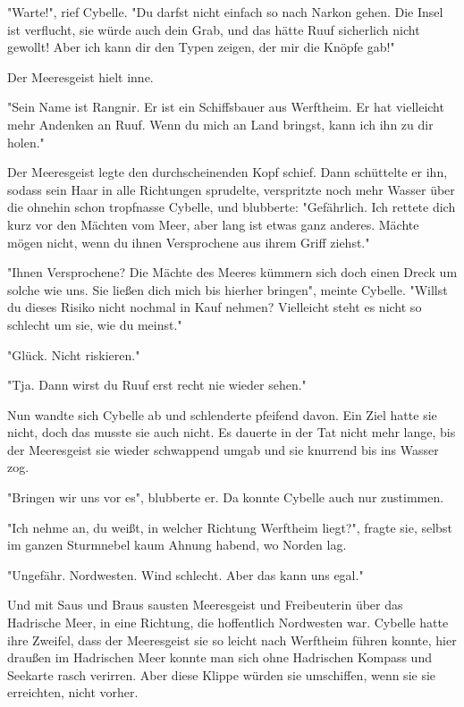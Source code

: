 "Warte!", rief Cybelle. "Du darfst nicht einfach so nach Narkon gehen. Die Insel ist verflucht, sie würde auch dein Grab, und das hätte Ruuf sicherlich nicht gewollt! Aber ich kann dir den Typen zeigen, der mir die Knöpfe gab!"

Der Meeresgeist hielt inne.

"Sein Name ist Rangnir. Er ist ein Schiffsbauer aus Werftheim. Er hat vielleicht mehr Andenken an Ruuf. Wenn du mich an Land bringst, kann ich ihn zu dir holen."

Der Meeresgeist legte den durchscheinenden Kopf schief. Dann schüttelte er ihn, sodass sein Haar in alle Richtungen sprudelte, verspritzte noch mehr Wasser über die ohnehin schon tropfnasse Cybelle, und blubberte: "Gefährlich. Ich rettete dich kurz vor den Mächten vom Meer, aber lang ist etwas ganz anderes. Mächte mögen nicht, wenn du ihnen Versprochene aus ihrem Griff ziehst."

"Ihnen Versprochene? Die Mächte des Meeres kümmern sich doch einen Dreck um solche wie uns. Sie ließen dich mich bis hierher bringen", meinte Cybelle. "Willst du dieses Risiko nicht nochmal in Kauf nehmen? Vielleicht steht es nicht so schlecht um sie, wie du meinst."

"Glück. Nicht riskieren."

"Tja. Dann wirst du Ruuf erst recht nie wieder sehen."

Nun wandte sich Cybelle ab und schlenderte pfeifend davon. Ein Ziel hatte sie nicht, doch das musste sie auch nicht. Es dauerte in der Tat nicht mehr lange, bis der Meeresgeist sie wieder schwappend umgab und sie knurrend bis ins Wasser zog.

"Bringen wir uns vor es", blubberte er. Da konnte Cybelle auch nur zustimmen.

"Ich nehme an, du weißt, in welcher Richtung Werftheim liegt?", fragte sie, selbst im ganzen Sturmnebel kaum Ahnung habend, wo Norden lag.

"Ungefähr. Nordwesten. Wind schlecht. Aber das kann uns egal."

Und mit Saus und Braus sausten Meeresgeist und Freibeuterin über das Hadrische Meer, in eine Richtung, die hoffentlich Nordwesten war. Cybelle hatte ihre Zweifel, dass der Meeresgeist sie so leicht nach Werftheim führen konnte, hier draußen im Hadrischen Meer konnte man sich ohne Hadrischen Kompass und Seekarte rasch verirren. Aber diese Klippe würden sie umschiffen, wenn sie sie erreichten, nicht vorher.

\trennzeichen

